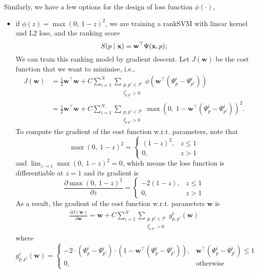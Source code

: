 Similarly, we have a few options for the design of loss function $\phi(\cdot)$,
\begin{itemize}
\item if $\phi(z) = \max(0,~ 1-z)^2$, we are training a rankSVM with linear kernel and L2 loss, and the ranking score 
      \begin{equation*}
      S(p \mid \mathbf{x})= \mathbf{w}^\top \Psi(\mathbf{x}, p);
      \end{equation*}
      We can train this ranking model by gradient descent. Let $J(\mathbf{w})$ be the cost function that we want to minimise, i.e.,
      \begin{align*}
      J(\mathbf{w})
      &= \frac{1}{2} \mathbf{w}^\top \mathbf{w} +  
         C \sum_{i=1}^N \sum_{\substack{p, p' \in \mathcal{P} \\ l_{p,p'}^i >0}} \phi \left( \mathbf{w}^\top (\Psi_p^i - \Psi_{p'}^i) \right) \\
      &= \frac{1}{2} \mathbf{w}^\top \mathbf{w} + 
         C \sum_{i=1}^N \sum_{\substack{p, p' \in \mathcal{P} \\ l_{p,p'}^i >0}} \max\left(0,~ 1 - \mathbf{w}^\top (\Psi_p^i - \Psi_{p'}^i) \right)^2.
      \end{align*}
      To compute the gradient of the cost function w.r.t. parameters, note that
      \begin{equation*}
      \max(0,~ 1-z)^2 
      = \begin{cases}
        (1-z)^2, & z \le 1 \\
        0,       & z > 1
        \end{cases}
      \end{equation*} 
      and $\lim_{z \to 1} \max(0,~ 1-z)^2 = 0$, which means the loss function is differentiable at $z=1$ and its gradient is
      \begin{equation*}
      \frac{\partial \max(0,~ 1-z)^2}{\partial z} 
      = \begin{cases}
        -2(1-z), & z \le 1 \\
        0,       & z > 1
        \end{cases}
      \end{equation*} 
      As a result, the gradient of the cost function w.r.t. parameters $\mathbf{w}$ is
      \begin{align*}
      \frac{\partial J(\mathbf{w})}{\partial \mathbf{w}} 
      = \mathbf{w} + C \sum_{i=1}^N \sum_{\substack{p, p' \in \mathcal{P} \\ l_{p,p'}^i >0}} g_{p,p'}^i(\mathbf{w})
      \end{align*} 
      where 
      \begin{equation*}
      g_{p,p'}^i(\mathbf{w}) 
      = \begin{cases}
        -2 \cdot (\Psi_p^i - \Psi_{p'}^i) \cdot \left(1 - \mathbf{w}^\top (\Psi_p^i - \Psi_{p'}^i) \right), 
        & \mathbf{w}^\top (\Psi_p^i - \Psi_{p'}^i) \le 1 \\
        0, 
        & \text{otherwise}
        \end{cases}
      \end{equation*}


\end{itemize}
